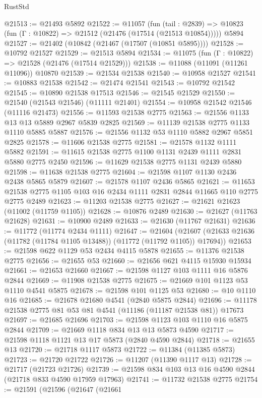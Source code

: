 \begin{lexlean}{RustStd}
\begin{coremodule}
@21513 := @21493 @5892
@21522 := @11057
    (fun (tail : @2839) => @10823 (fun (Γ : @10822) => @21512 (@21476 (@17514 (@21513 @10854)))))
    @5894
@21527 := @21402 (@10842 (@21467 (@17507 (@10851 @5895))))
@21528 := @10792 @21527
@21529 := @21513 @5894
@21534 := @11075 (fun (Γ : @10822) => @21528 (@21476 (@17514 @21529)))
@21538 := @11088 (@11091 (@11261 @11096)) @10870
@21539 := @21534 @21538
@21540 := @10958 @21527
@21541 := @10883 @21538
@21542 := @21474 @21541
@21543 := @10792 @21542
@21545 := @10890 @21538 @17513
@21546 := @21545 @21529
@21550 := @21540 (@21543 @21546) (@11111 @21401)
@21554 := @10958 @21542 @21546 (@11116 @21473)
@21556 := @11593 @21538 @2775
@21563 := @21556 @1133 @13 @13 @5889 @2967 @5839 @2825
@21569 := @11139 @21538 @2775 @1133 @1110 @5885 @5887
@21576 := @21556 @1132 @53 @1110 @5882 @2967 @5851 @2825
@21578 := @11606 @21538 @2775
@21581 := @21578 @1132 @1111 @5882
@21591 := @11615 @21538 @2775 @1100 @1131 @2439 @1111 @2831 @5880 @2775 @2450
@21596 := @11629 @21538 @2775 @1131 @2439 @5880
@21598 := @11638 @21538 @2775
@21604 := @21598 @1107 @1130 @2436 @2438 @5865 @5879
@21607 := @21578 @1107 @2436 @5865
@21621 := @11653 @21538 @2775 @1105 @103 @16 @2434 @1111 @2831 @2844 @11665 @110 @2775 @2775 @2489
@21623 := @11203 @21538 @2775
@21627 := @21621 @21623 (@11002 (@11759 @1105))
@21628 := @10876 @2489
@21630 := @21627 (@11763 @21628)
@21631 := @10900 @2489
@21633 := @21630 (@11767 @21631)
@21636 := @11772 (@11774 @2434 @1111)
@21647 := @21604
    (@21607 (@21633 @21636 (@11782 (@11784 @1105 @13488)) (@11772 (@11792 @1105)) @17694))
@21653 := @21598 @622 @1129 @53 @2434 @4115 @5878
@21655 := @11376 @21538 @2775
@21656 := @21655 @53
@21660 := @21656 @621 @4115 @15930 @15934
@21661 := @21653 @21660
@21667 := @21598 @1127 @103 @1111 @16 @5876 @2844
@21669 := @11908 @21538 @2775
@21675 := @21669 @101 @1123 @53 @1110 @4541 @5875
@21678 := @21598 @101 @1125 @53
@21680 := @10 @1110 @16
@21685 := @21678 @21680 @4541 (@2840 @5875 @2844)
@21696 := @11178 @21538 @2775 @81 @53 @81 @4541 (@11186 (@11187 @21538 @81)) @17673
@21697 := @21685 @21696
@21703 := @21598 @1123 @103 @1110 @16 @5875 @2844
@21709 := @21669 @1118 @834 @13 @13 @5873 @4590
@21717 := @21598 @1118 @1121 @13 @17 @5873 (@2840 @4590 @2844)
@21718 := @21655 @13
@21720 := @21718 @1117 @5873
@21722 := @11384 (@11385 @5873)
@21723 := @21720 @21722
@21726 := @11207 (@11390 @1117 @13)
@21728 := @21717 (@21723 @21726)
@21739 := @21598 @834 @103 @13 @16 @4590 @2844 (@21718 @833 @4590 @17959 @17963)
@21741 := @11732 @21538 @2775
@21754 := @21591
    (@21596
      (@21647
        (@21661

\end{coremodule}
\end{lexlean}
